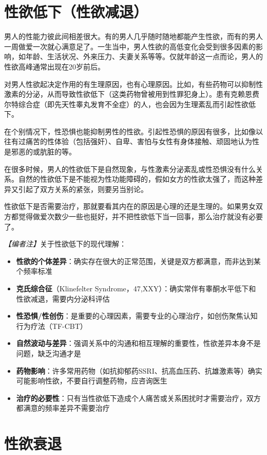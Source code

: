 \section{性欲低下（性欲减退）}

男人的性能力彼此间相差很大。有的男人几乎随时随地都能产生性欲，而有的男人一周做爱一次就心满意足了。一生当中，男人性欲的高低变化会受到很多因素的影响，如年龄、生活状况、外来压力、夫妻关系等等。仅就年龄这一点而论，男人的性欲高峰通常出现在20岁前后。

对男人性欲起决定作用的有生理原因，也有心理原因。比如，有些药物可以抑制性激素的分泌，从而导致性欲低下（这类药物曾被用到性罪犯身上）。患有克赖恩费尔特综合症（即先天性睾丸发育不全症）的人，也会因为生理紊乱而引起性欲低下。

在个别情况下，性恐惧也能抑制男性的性欲。引起性恐惧的原因有很多，比如像以往有过痛苦的性体验（包括强奸）、自卑、害怕与女性有身体接触、顽固地认为性是邪恶的或肮脏的等。

在很多时候，男人的性欲低下是自然现象，与性激素分泌紊乱或性恐惧没有什么关系。自然的性欲低下是不能视为性功能障碍的，假如女方的性欲太强了，而这种差异又引起了双方关系的紧张，则要另当别论。

性欲低下是否需要治疗，那就要看其内在的原因是心理的还是生理的。如果男女双方都觉得做爱次数少一些也挺好，并不把性欲低下当一回事，那么治疗就没有必要了。

\noindent\textit{【编者注】}关于性欲低下的现代理解：
\begin{itemize}
	\item \textbf{性欲的个体差异}：确实存在很大的正常范围，关键是双方都满意，而非达到某个频率标准
	\item \textbf{克氏综合征}（Klinefelter Syndrome，47,XXY）：确实常伴有睾酮水平低下和性欲减退，需要内分泌科评估
	\item \textbf{性恐惧/性创伤}：是重要的心理因素，需要专业的心理治疗，如创伤聚焦认知行为疗法（TF-CBT）
	\item \textbf{自然波动与差异}：强调关系中的沟通和相互理解的重要性，性欲差异本身不是问题，缺乏沟通才是
	\item \textbf{药物影响}：许多常用药物（如抗抑郁药SSRI、抗高血压药、抗雄激素等）确实可能影响性欲，不要自行调整药物，应咨询医生
	\item \textbf{治疗的必要性}：只有当性欲低下造成个人痛苦或关系困扰时才需要治疗，双方都满意的频率差异不需要治疗
\end{itemize}

\section{性欲衰退}

